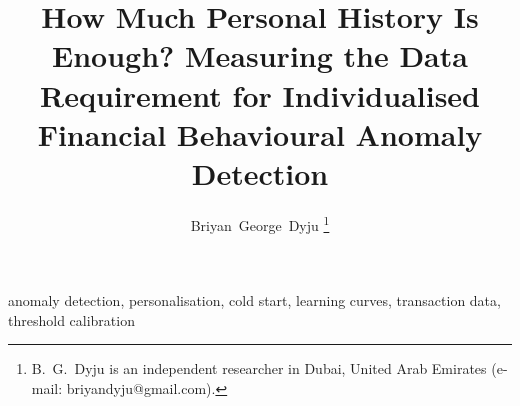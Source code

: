 \documentclass[journal]{IEEEtran}
\title{How Much Personal History Is Enough? Measuring the Data Requirement for Individualised Financial Behavioural Anomaly Detection}
\author{Briyan~George~Dyju%
\thanks{B.~G.~Dyju is an independent researcher in Dubai, United Arab Emirates (e-mail: briyandyju@gmail.com).}}
\begin{document}
\maketitle

\begin{abstract}

\end{abstract}

\begin{IEEEkeywords}
anomaly detection, personalisation, cold start, learning curves, transaction data, threshold calibration
\end{IEEEkeywords}









\appendices




\end{document}
